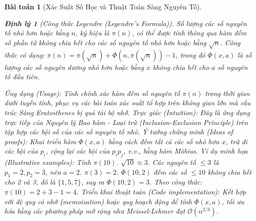 \documentclass{article}
\newtheorem{baitoan}{Bài toán}
\newtheorem{dinhly}{Định lý}
\begin{document}
\begin{baitoan}[Xác Suất Số Học và Thuật Toán Sàng Nguyên Tố]
\begin{dinhly}[Công thức Legendre (Legendre's Formula)]
    Số lượng các số nguyên tố nhỏ hơn hoặc bằng $n$, ký hiệu là $\pi(n)$, có thể được tính thông qua hàm đếm số phần tử không chia hết cho các số nguyên tố nhỏ hơn hoặc bằng $\sqrt{n}$. Công thức có dạng: $\pi(n) = \pi(\sqrt{n}) + \Phi(n, \pi(\sqrt{n})) - 1$, trong đó $\Phi(x, a)$ là số lượng các số nguyên dương nhỏ hơn hoặc bằng $x$ không chia hết cho $a$ số nguyên tố đầu tiên.
\end{dinhly}
\emph{Ứng dụng (Usage):} Tính chính xác hàm đếm số nguyên tố $\pi(n)$ trong thời gian dưới tuyến tính, phục vụ các bài toán xác suất tổ hợp trên không gian lớn mà cấu trúc Sàng Eratosthenes bị quá tải bộ nhớ.
\emph{Trực giác (Intuition):} Đây là ứng dụng trực tiếp của Nguyên lý Bao hàm - Loại trừ (Inclusion-Exclusion Principle) trên tập hợp các bội số của các số nguyên tố nhỏ.
\emph{Ý tưởng chứng minh (Ideas of proofs):} Khai triển hàm $\Phi(x, a)$ bằng cách đếm tất cả các số nhỏ hơn $x$, trừ đi các bội của $p_i$, cộng lại các bội của $p_i p_j$, v.v., bằng hàm Möbius.
\emph{Ví dụ minh họa (Illustrative examples):} Tính $\pi(10)$. $\sqrt{10} \approx 3$. Các nguyên tố $\le 3$ là $p_1=2, p_2=3$, nên $a=2$. $\pi(3) = 2$. $\Phi(10, 2)$ đếm các số $\le 10$ không chia hết cho 2 và 3, đó là $\{1, 5, 7\}$, suy ra $\Phi(10, 2) = 3$. Theo công thức: $\pi(10) = 2 + 3 - 1 = 4$.
\emph{Triển khai thuật toán (Code implementation):} Kết hợp với đệ quy có nhớ (memoization) hoặc quy hoạch động để tính $\Phi(x, a)$, tối ưu hóa bằng các phương pháp mở rộng như Meissel-Lehmer đạt $\mathcal{O}(n^{2/3})$.




\end{baitoan}
\end{document}
